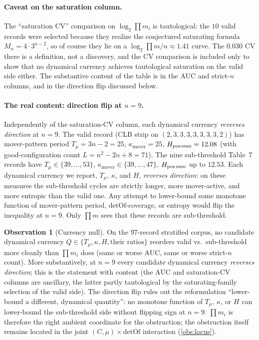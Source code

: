 \documentclass[11pt,a4paper]{article}
\theoremstyle{plain}
\theoremstyle{definition}
\newtheorem{observation}[theorem]{Observation}
\newcommand{\Mn}{M_n}
\newcommand{\detOf}{\mathrm{detOf}}
\begin{document}
\paragraph{Caveat on the saturation column.}  The ``saturation
CV'' comparison on $\log_2 \prod m_i$ is tautological: the $10$
valid records were selected because they realize the conjectured
saturating formula $\Mn = 4 \cdot 3^{n-2}$, so of course they lie
on a $\log_2 \prod m / n \approx 1.41$ curve.  The $0.030$ CV there
is a definition, not a discovery, and the CV comparison is included
only to show that no dynamical currency achieves tautological
saturation on the valid side either.  The substantive content of
the table is in the AUC and strict-$n$ columns, and in the
direction flip discussed below.

\paragraph{The real content: direction flip at $n = 9$.}
Independently of the saturation-CV column, each dynamical currency
\emph{reverses direction} at $n = 9$.  The valid record (CLB strip
on $(2, 3, 3, 3, 3, 3, 3, 3, 2)$) has mover-pattern period
$T_\mu = 3n - 2 = 25$, $\kappa_{\text{mover}} = 25$,
$H_{\text{pos\,sum}} = 12.08$ (with good-configuration count
$L = n^2 - 2n + 8 = 71$).  The nine sub-threshold Table~7 records
have $T_\mu \in \{39, \ldots, 53\}$,
$\kappa_{\text{mover}} \in \{39, \ldots, 47\}$,
$H_{\text{pos\,sum}}$ up to $12.53$.  Each dynamical currency we
report, $T_\mu$, $\kappa$, and $H$, \emph{reverses
direction}: on these measures the sub-threshold cycles are
strictly longer, more mover-active, and more entropic than the
valid one.  Any attempt to lower-bound some monotone function of
mover-pattern period, $\detOf$-coverage, or entropy would flip
the inequality at $n = 9$.  Only $\prod m$ sees that these records
are sub-threshold.

\begin{observation}[Currency null]\label{obs:currency-null}
On the $97$-record stratified corpus, no candidate dynamical
currency $Q \in \{T_\mu, \kappa, H, \text{their ratios}\}$
reorders valid vs.\ sub-threshold more cleanly than $\prod m_i$
does (same or worse AUC, same or worse strict-$n$ count).  More
substantively,
at $n = 9$ every candidate dynamical currency \emph{reverses
direction}; this is the statement with content (the AUC and
saturation-CV columns are ancillary, the latter partly tautological
by the saturating-family selection of the valid side).  The
direction flip rules out the reformulation ``lower-bound a
different, dynamical quantity'': no monotone function of
$T_\mu$, $\kappa$, or $H$ can lower-bound the sub-threshold side
without flipping sign at $n = 9$.  $\prod m_i$ is therefore the right
ambient
coordinate for the obstruction; the obstruction itself remains
located in the joint $(C, \mu) \times \detOf$ interaction
(\cref{obs:locus}).
\end{observation}
\end{document}
